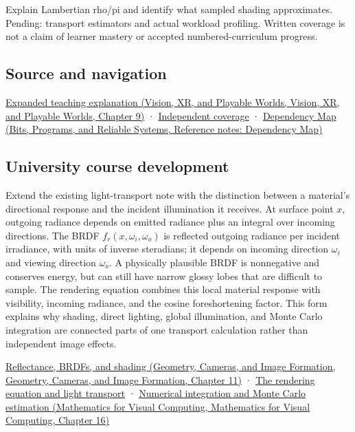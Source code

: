 Explain Lambertian rho/pi and identify what sampled shading approximates. Pending: transport estimators and actual workload profiling. Written coverage is not a claim of learner mastery or accepted numbered-curriculum progress.

\subsection{Source and navigation}\label{appendix-96da0b153b77-source-and-navigation}

\href{../07-Vision-XR-and-Playable-Worlds/main.pdf\#nameddest=04-visual-computing-ii-ch042-materials-turn-incoming-light-into-outgoing-light}{Expanded teaching explanation (Vision, XR, and Playable Worlds, Vision, XR, and Playable Worlds, Chapter 9)} · \hyperref[appendix-fd090d982a15-xr01---independent-seeing-and-representation-source]{Independent coverage} · \href{../01-Bits-Programs-and-Reliable-Systems/main.pdf\#nameddest=appendix-4ad47bdd269a}{Dependency Map (Bits, Programs, and Reliable Systems, Reference notes: Dependency Map)}

\subsection{University course development}\label{appendix-96da0b153b77-university-course-development}

Extend the existing light-transport note with the distinction between a material's directional response and the incident illumination it receives. At surface point \(x\), outgoing radiance depends on emitted radiance plus an integral over incoming directions. The BRDF \(f_r(x,\omega_i,\omega_o)\) is reflected outgoing radiance per incident irradiance, with units of inverse steradians; it depends on incoming direction \(\omega_i\) and viewing direction \(\omega_o\). A physically plausible BRDF is nonnegative and conserves energy, but can still have narrow glossy lobes that are difficult to sample. The rendering equation combines this local material response with visibility, incoming radiance, and the cosine foreshortening factor. This form explains why shading, direct lighting, global illumination, and Monte Carlo integration are connected parts of one transport calculation rather than independent image effects.

\href{../03-Geometry-Cameras-and-Image-Formation/main.pdf\#nameddest=03-visual-computing-i-ch004-reflectance-brdfs-and-shading}{Reflectance, BRDFs, and shading (Geometry, Cameras, and Image Formation, Geometry, Cameras, and Image Formation, Chapter 11)} · \hyperref[03-visual-computing-i-ch007-the-rendering-equation-and-light-transport]{The rendering equation and light transport} · \href{../02-Mathematics-for-Visual-Computing/main.pdf\#nameddest=03-visual-computing-i-ch012-numerical-integration-and-monte-carlo-estimation}{Numerical integration and Monte Carlo estimation (Mathematics for Visual Computing, Mathematics for Visual Computing, Chapter 16)}

